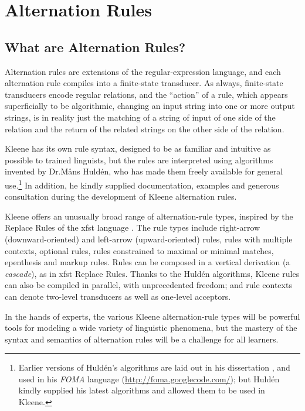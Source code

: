\chapter{Alternation Rules}

\section{What are Alternation Rules?}

Alternation rules are extensions of the regular-expression language, and each alternation rule compiles into a
finite-state transducer.  As always, finite-state transducers encode regular relations, and the ``action'' of a rule,
which appears superficially to be algorithmic, changing an input string into one or more output strings, is in
reality just the matching of a string of input of one side of the relation and the return of the related strings on the
other side of the relation.

Kleene has its own rule syntax, designed to be as familiar and intuitive as possible to trained linguists, but the
rules are interpreted using algorithms invented by Dr.\@ M\r{a}ns Huldén, who has made them freely available for
general use.\footnote{Earlier versions of Huldén's algorithms are laid
out in his dissertation \citep{hulden:2009thesis}, and
used in his \emph{FOMA} language (\url{http://foma.googlecode.com/});
but Huldén kindly supplied his latest algorithms and
allowed them to be used in Kleene.}  In addition, he kindly supplied documentation, examples and generous consultation
during the development of Kleene alternation rules.  

Kleene offers an unusually broad range of alternation-rule types, inspired by the Replace Rules of the xfst
language \citep{beesley+karttunen:2003}.  The rule types include right-arrow (downward-oriented) and
left-arrow (upward-oriented) rules, rules with multiple contexts, optional rules, rules constrained
to maximal or minimal matches, epenthesis and markup rules.   Rules can be composed in a vertical
derivation (a \emph{cascade}), as in xfst Replace Rules.  Thanks to the Huldén algorithms, Kleene rules can
also be compiled in parallel, with unprecedented freedom; and rule contexts can denote two-level
transducers as well as one-level acceptors.

In the hands of experts, the various Kleene alternation-rule types will be powerful tools for
modeling a wide variety of linguistic phenomena, but the mastery of the syntax and semantics of
alternation rules will be a challenge for all learners.

